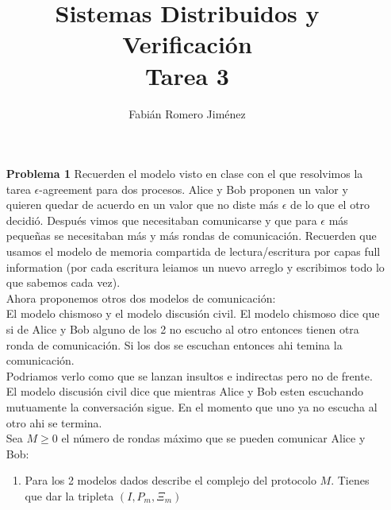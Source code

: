 \documentclass{article}
\title{Sistemas Distribuidos y Verificación \\ Tarea 3}
\author{Fabián Romero Jiménez}
\date{}
\begin{document}
\maketitle
\begin{enumerate}

\item[\bf{Problema 1}]  Recuerden el modelo visto en clase con el que resolvimos la tarea 
$\epsilon$-agreement para dos procesos. 
Alice y Bob proponen un valor y quieren quedar de acuerdo en un valor que no diste más $\epsilon$ de lo que el otro decidió. Después vimos que necesitaban comunicarse y que para $\epsilon$ más pequeñas se necesitaban más y más rondas de comunicación.
 Recuerden que usamos el modelo de memoria compartida de lectura/escritura por capas full information (por cada escritura leiamos un nuevo arreglo y escribimos todo lo que sabemos cada vez).\\
Ahora proponemos otros dos modelos de comunicación:\\
El modelo chismoso y el modelo discusión civil. El modelo chismoso dice que si de Alice
y Bob alguno de los 2 no escucho al otro entonces tienen otra ronda de comunicación.
 Si los dos se escuchan entonces ahi temina la comunicación.\\
Podriamos verlo como que se lanzan insultos e indirectas pero no de frente.\\
El modelo discusión civil dice que mientras Alice y Bob esten escuchando mutuamente la conversación sigue. En el momento que uno ya no escucha al otro ahi se termina.\\
Sea $M \ge 0$ el número de rondas máximo que se pueden comunicar Alice y Bob:
\newpage
\begin{enumerate}
\item Para los 2 modelos dados describe el complejo del protocolo $M$. Tienes que dar la tripleta $( I, P_m , \Xi_ m)$


\end{enumerate}
\end{enumerate}
\end{document}
